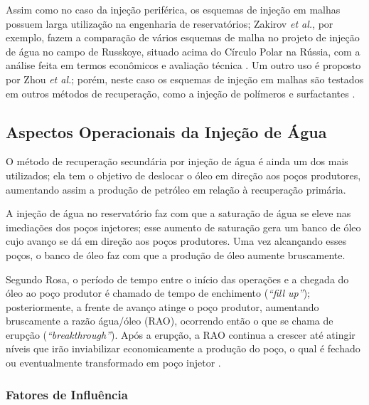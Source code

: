 Assim como no caso da inje\c{c}\~{a}o perif\'{e}rica, os esquemas de inje\c{c}\~{a}o em malhas possuem larga utiliza\c{c}\~{a}o na engenharia de reservat\'{o}rios; Zakirov \textit{et al.}, por exemplo, fazem a compara\c{c}\~{a}o de v\'{a}rios esquemas de malha no projeto de inje\c{c}\~{a}o de \'{a}gua no campo de Russkoye, situado acima do C\'{i}rculo Polar na R\'{u}ssia, com a an\'{a}lise feita em termos econ\^{o}micos e avalia\c{c}\~{a}o t\'{e}cnica \cite{zakirov2012}. Um outro uso \'{e} proposto por Zhou \textit{et al.}; por\'{e}m, neste caso os esquemas de inje\c{c}\~{a}o em malhas s\~{a}o testados em outros m\'{e}todos de recupera\c{c}\~{a}o, como a inje\c{c}\~{a}o de pol\'{i}meros e surfactantes \cite{zhou2016}.

\subsection{Aspectos Operacionais da Inje\c{c}\~{a}o de \'{A}gua}

O m\'{e}todo de recupera\c{c}\~{a}o secund\'{a}ria por inje\c{c}\~{a}o de \'{a}gua \'{e} ainda um dos mais utilizados; ela tem o objetivo de deslocar o \'{o}leo em dire\c{c}\~{a}o aos po\c{c}os produtores, aumentando assim a produ\c{c}\~{a}o de petr\'{o}leo em rela\c{c}\~{a}o \`{a} recupera\c{c}\~{a}o prim\'{a}ria.

A inje\c{c}\~{a}o de \'{a}gua no reservat\'{o}rio faz com que a satura\c{c}\~{a}o de \'{a}gua se eleve nas imedia\c{c}\~{o}es dos po\c{c}os injetores; esse aumento de satura\c{c}\~{a}o gera um banco de \'{o}leo cujo avan\c{c}o se d\'{a} em dire\c{c}\~{a}o aos po\c{c}os produtores. Uma vez alcan\c{c}ando esses po\c{c}os, o banco de \'{o}leo faz com que a produ\c{c}\~{a}o de \'{o}leo aumente bruscamente. 

Segundo Rosa, o per\'{i}odo de tempo entre o in\'{i}cio das opera\c{c}\~{o}es e a chegada do \'{o}leo ao po\c{c}o produtor \'{e} chamado de tempo de enchimento (\textit{``fill up''}); posteriormente, a frente de avan\c{c}o atinge o po\c{c}o produtor, aumentando bruscamente a raz\~{a}o \'{a}gua/\'{o}leo (RAO), ocorrendo ent\~{a}o o que se chama de erup\c{c}\~{a}o (\textit{``breakthrough''}). Ap\'{o}s a erup\c{c}\~{a}o, a RAO continua a crescer at\'{e} atingir n\'{i}veis que ir\~{a}o inviabilizar economicamente a produ\c{c}\~{a}o do po\c{c}o, o qual \'{e} fechado ou eventualmente transformado em po\c{c}o injetor \cite{engres}.

\subsubsection{Fatores de Influ\^{e}ncia}

